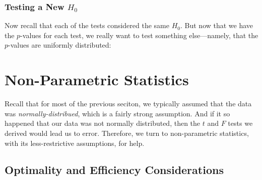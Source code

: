 \documentclass[a4paper,12pt]{scrartcl}
\begin{document}
\subsubsection{Testing a New $H_0$}

Now recall that each of the tests considered the same $H_0$. But
now that we have the $p$-values for each test, we really want
to test something else---namely, that the $p$-values are uniformly
distributed:



\newpage
\section{Non-Parametric Statistics}

Recall that for most of the previous seciton, we typically assumed
that the data was \emph{normally-distribued}, which is a fairly strong
assumption.  And if it so happened that our data was not normally
distributed, then the $t$ and $F$ tests we derived would lead us
to error.  Therefore, we turn to non-parametric statistics, with its
less-restrictive assumptions, for help. 

\subsection{Optimality and Efficiency Considerations}
\end{document}
